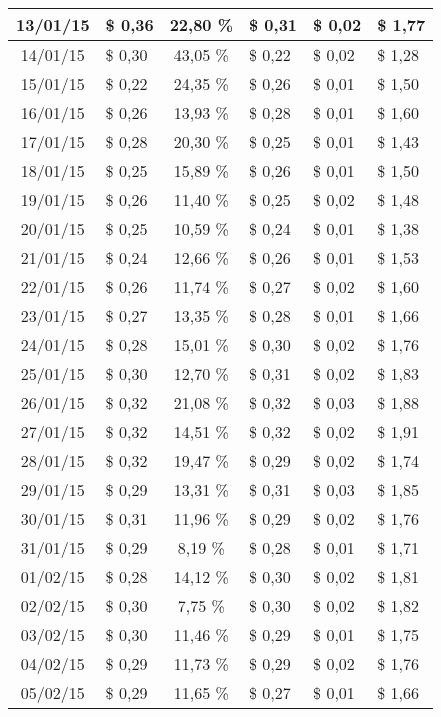 \begin{center}
\begin{small}
\begin{longtable}{|c|l|c|l|l|l|}
13/01/15 & \$ 0,36 & 22,80 \% & \$ 0,31 & \$ 0,02 & \$ 1,77 \\ \hline
14/01/15 & \$ 0,30 & 43,05 \% & \$ 0,22 & \$ 0,02 & \$ 1,28 \\ \hline
15/01/15 & \$ 0,22 & 24,35 \% & \$ 0,26 & \$ 0,01 & \$ 1,50 \\ \hline
16/01/15 & \$ 0,26 & 13,93 \% & \$ 0,28 & \$ 0,01 & \$ 1,60 \\ \hline
17/01/15 & \$ 0,28 & 20,30 \% & \$ 0,25 & \$ 0,01 & \$ 1,43 \\ \hline
18/01/15 & \$ 0,25 & 15,89 \% & \$ 0,26 & \$ 0,01 & \$ 1,50 \\ \hline
19/01/15 & \$ 0,26 & 11,40 \% & \$ 0,25 & \$ 0,02 & \$ 1,48 \\ \hline
20/01/15 & \$ 0,25 & 10,59 \% & \$ 0,24 & \$ 0,01 & \$ 1,38 \\ \hline
21/01/15 & \$ 0,24 & 12,66 \% & \$ 0,26 & \$ 0,01 & \$ 1,53 \\ \hline
22/01/15 & \$ 0,26 & 11,74 \% & \$ 0,27 & \$ 0,02 & \$ 1,60 \\ \hline
23/01/15 & \$ 0,27 & 13,35 \% & \$ 0,28 & \$ 0,01 & \$ 1,66 \\ \hline
24/01/15 & \$ 0,28 & 15,01 \% & \$ 0,30 & \$ 0,02 & \$ 1,76 \\ \hline
25/01/15 & \$ 0,30 & 12,70 \% & \$ 0,31 & \$ 0,02 & \$ 1,83 \\ \hline
26/01/15 & \$ 0,32 & 21,08 \% & \$ 0,32 & \$ 0,03 & \$ 1,88 \\ \hline
27/01/15 & \$ 0,32 & 14,51 \% & \$ 0,32 & \$ 0,02 & \$ 1,91 \\ \hline
28/01/15 & \$ 0,32 & 19,47 \% & \$ 0,29 & \$ 0,02 & \$ 1,74 \\ \hline
29/01/15 & \$ 0,29 & 13,31 \% & \$ 0,31 & \$ 0,03 & \$ 1,85 \\ \hline
30/01/15 & \$ 0,31 & 11,96 \% & \$ 0,29 & \$ 0,02 & \$ 1,76 \\ \hline
31/01/15 & \$ 0,29 & 8,19 \% & \$ 0,28 & \$ 0,01 & \$ 1,71 \\ \hline
01/02/15 & \$ 0,28 & 14,12 \% & \$ 0,30 & \$ 0,02 & \$ 1,81 \\ \hline
02/02/15 & \$ 0,30 & 7,75 \% & \$ 0,30 & \$ 0,02 & \$ 1,82 \\ \hline
03/02/15 & \$ 0,30 & 11,46 \% & \$ 0,29 & \$ 0,01 & \$ 1,75 \\ \hline
04/02/15 & \$ 0,29 & 11,73 \% & \$ 0,29 & \$ 0,02 & \$ 1,76 \\ \hline
05/02/15 & \$ 0,29 & 11,65 \% & \$ 0,27 & \$ 0,01 & \$ 1,66 \\ \hline

\end{longtable}
\end{small}
\end{center}
